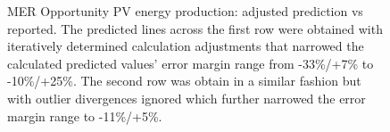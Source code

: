 \begin{figure}[h]
\begin{subfigure}[t]{\subfigureWidth}
		\label{fig:plot:sub:mer-energy-production-predicted-vs-reported-my32-adjusted-without-outliers}
	\end{subfigure}
    \caption[\ac{MER} Opportunity \ac{PV} energy production: adjusted prediction vs reported]
            {\ac{MER} Opportunity \ac{PV} energy production: adjusted prediction vs reported. The predicted lines across the first row were obtained with iteratively determined calculation adjustments that narrowed the calculated predicted values' error margin range from -33\%/+7\% to -10\%/+25\%. The second row was obtain in a similar fashion but with outlier divergences ignored which further narrowed the error margin range to -11\%/+5\%.}
    \label{fig:plot:mer-energy-production-predicted-vs-reported-adjusted-with-and-without-outliers}
\vspace{-2ex}
\end{figure}

\clearpage
